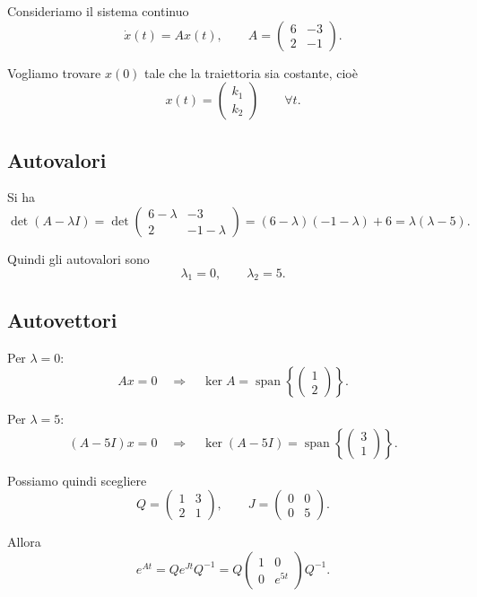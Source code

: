 Consideriamo il sistema continuo
\begin{equation}
\dot{x}(t)=Ax(t),
\qquad
A=
\begin{pmatrix}
6 & -3\\
2 & -1
\end{pmatrix}.
\label{eq:L9_Asmall}
\end{equation}

Vogliamo trovare $x(0)$ tale che la traiettoria sia costante, cioè
\[
x(t)=
\begin{pmatrix}
k_1\\
k_2
\end{pmatrix}
\qquad \forall t.
\]

\subsection*{Autovalori}

Si ha
\[
\det(A-\lambda I)=
\det\begin{pmatrix}
6-\lambda & -3\\
2 & -1-\lambda
\end{pmatrix}
=
(6-\lambda)(-1-\lambda)+6
=
\lambda(\lambda-5).
\]

Quindi gli autovalori sono
\[
\lambda_1=0,
\qquad
\lambda_2=5.
\]

\subsection*{Autovettori}

Per $\lambda=0$:
\[
Ax=0
\quad \Longrightarrow \quad
\ker A = \operatorname{span}\left\{
\begin{pmatrix}
1\\
2
\end{pmatrix}
\right\}.
\]

Per $\lambda=5$:
\[
(A-5I)x=0
\quad \Longrightarrow \quad
\ker(A-5I)=\operatorname{span}\left\{
\begin{pmatrix}
3\\
1
\end{pmatrix}
\right\}.
\]

Possiamo quindi scegliere
\[
Q=
\begin{pmatrix}
1 & 3\\
2 & 1
\end{pmatrix},
\qquad
J=
\begin{pmatrix}
0 & 0\\
0 & 5
\end{pmatrix}.
\]

Allora
\[
e^{At}=Qe^{Jt}Q^{-1}
=
Q
\begin{pmatrix}
1 & 0\\
0 & e^{5t}
\end{pmatrix}
Q^{-1}.
\]

